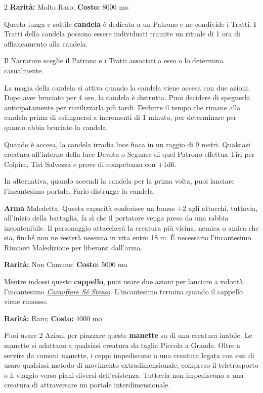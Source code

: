 \begin{multicols}{2}
\textbf{Rarità:} Molto Raro; \textbf{Costo:} 8000 mo

Questa lunga e sottile \textbf{candela} è dedicata a un Patrono e ne condivide i Tratti. I Tratti della candela possono essere individuati tramite un rituale di 1 ora di affiancamento alla candela.

Il Narratore sceglie il Patrono e i Tratti associati a esso o lo determina casualmente.

La magia della candela si attiva quando la candela viene accesa con due azioni. Dopo aver bruciato per 4 ore, la candela è distrutta. Puoi decidere di spegnerla anticipatamente per riutilizzarla più tardi. Dedurre il tempo che rimane alla candela prima di estinguersi a incrementi di 1 minuto, per determinare per quanto abbia bruciato la candela.

Quando è accesa, la candela irradia luce fioca in un raggio di 9 metri. Qualsiasi creatura all'interno della luce Devota o Seguace di quel Patrono effettua Tiri per Colpire, Tiri Salvezza e prove di competenza con +1d6.

In alternativa, quando accendi la candela per la prima volta, puoi lanciare l'incantesimo portale. Farlo distrugge la candela.


\textbf{Arma} Maledetta. Questa capacità conferisce un bonus +2 agli attacchi, tuttavia, all'inizio della battaglia, fa sì che il portatore venga preso da una rabbia incontenibile. Il personaggio attaccherà la creatura più vicina, nemica o amica che sia, finché non ne resterà nessuna in vita entro 18 m. È necessario l'incantesimo Rimuovi Maledizione per liberarsi dall'arma.


\textbf{Rarità:} Non Comune; \textbf{Costo:} 5000 mo

Mentre indossi questo \textbf{cappello}, puoi usare due azioni per lanciare a volontà l'incantesimo \emph{\hyperlink{Camuffare Sé Stesso}{Camuffare Sé Stesso}}. L'incantesimo termina quando il cappello viene rimosso.


\textbf{Rarità:} Raro; \textbf{Costo:} 4000 mo

Puoi usare 2 Azioni per piazzare queste \textbf{manette} su di una creatura inabile. Le manette si adattano a qualsiasi creatura da taglia Piccola a Grande. Oltre a servire da comuni manette, i ceppi impediscono a una creatura legata con essi di usare qualsiasi metodo di movimento extradimensionale, compreso il teletrasporto o il viaggio verso piani diversi dell'esistenza. Tuttavia non impediscono a una creatura di attraversare un portale interdimensionale.


\end{multicols}

